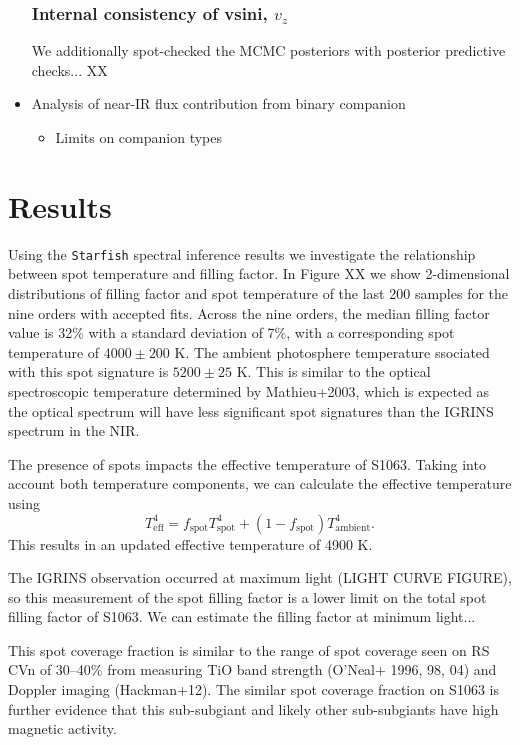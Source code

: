\documentclass[twocolumn]{emulateapj}%
\begin{document}
\begin{itemize}
\subsubsection{Internal consistency of vsini, $v_z$}
We additionally spot-checked the MCMC posteriors with posterior predictive checks... XX

\item Analysis of near-IR flux contribution from binary companion
\begin{itemize}
  \item Limits on companion types
\end{itemize}
\end{itemize}

\section{Results}

Using the \texttt{Starfish} spectral inference results we investigate the relationship between spot temperature and filling factor. In Figure XX we show 2-dimensional distributions of filling factor and spot temperature of the last 200 samples for the nine orders with accepted fits. Across the nine orders, the median filling factor value is 32\% with a standard deviation of 7\%, with a corresponding spot temperature of $4000 \pm 200$ K. The ambient photosphere temperature ssociated with this spot signature is $5200\pm25$ K. This is similar to the optical spectroscopic temperature determined by Mathieu+2003, which is expected as the optical spectrum will have less significant spot signatures than the IGRINS spectrum in the NIR.

The presence of spots impacts the effective temperature of S1063. Taking into account both temperature components, we can calculate the effective temperature using
\begin{equation}
T_{\textrm{eff}}^4 = f_{\textrm{spot}} T_{\textrm{spot}}^4 + (1 -f_{\textrm{spot}}) T_{\textrm{ambient}}^4 .
\end{equation}
This results in an updated effective temperature of 4900 K.

The IGRINS observation occurred at maximum light (LIGHT CURVE FIGURE), so this measurement of the spot filling factor is a lower limit on the total spot filling factor of S1063. We can estimate the filling factor at minimum light...

This spot coverage fraction is similar to the range of spot coverage seen on RS CVn of 30--40\% from measuring TiO band strength (O'Neal+ 1996, 98, 04) and Doppler imaging (Hackman+12). The similar spot coverage fraction on S1063 is further evidence that this sub-subgiant and likely other sub-subgiants have high magnetic activity.
\end{document}
